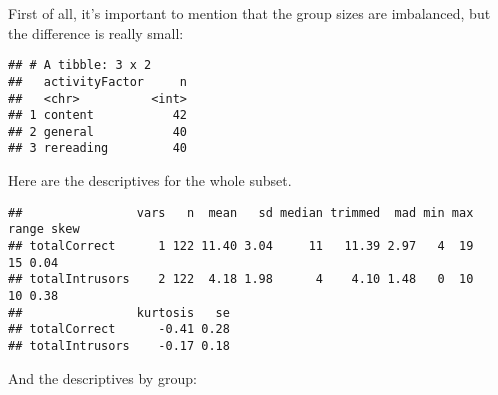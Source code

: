 \documentclass[12pt,]{article}
\newenvironment{Shaded}{\begin{snugshade}}{\end{snugshade}}
\newcommand{\DataTypeTok}[1]{\textcolor[rgb]{0.13,0.29,0.53}{#1}}
\newcommand{\KeywordTok}[1]{\textcolor[rgb]{0.13,0.29,0.53}{\textbf{#1}}}
\newcommand{\NormalTok}[1]{#1}
\newcommand{\OperatorTok}[1]{\textcolor[rgb]{0.81,0.36,0.00}{\textbf{#1}}}
\newcommand{\StringTok}[1]{\textcolor[rgb]{0.31,0.60,0.02}{#1}}
\begin{document}
First of all, it's important to mention that the group sizes are
imbalanced, but the difference is really small:

\begin{Shaded}
\end{Shaded}

\begin{verbatim}
## # A tibble: 3 x 2
##   activityFactor     n
##   <chr>          <int>
## 1 content           42
## 2 general           40
## 3 rereading         40
\end{verbatim}

Here are the descriptives for the whole subset.

\begin{Shaded}
\end{Shaded}

\begin{verbatim}
##                vars   n  mean   sd median trimmed  mad min max range skew
## totalCorrect      1 122 11.40 3.04     11   11.39 2.97   4  19    15 0.04
## totalIntrusors    2 122  4.18 1.98      4    4.10 1.48   0  10    10 0.38
##                kurtosis   se
## totalCorrect      -0.41 0.28
## totalIntrusors    -0.17 0.18
\end{verbatim}

And the descriptives by group:

\begin{Shaded}
\end{Shaded}
\end{document}
